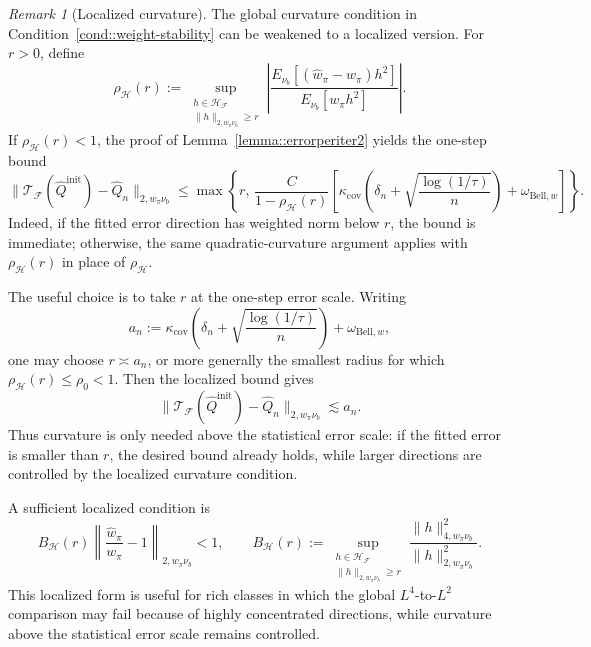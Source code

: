 \documentclass{article}
\theoremstyle{plain}
\theoremstyle{definition}
\theoremstyle{remark}
\newtheorem{remark}{Remark}
\begin{document}
\begin{remark}[Localized curvature]
\label{rem:localized-curvature}
The global curvature condition in Condition~\ref{cond::weight-stability} can be
weakened to a localized version. For \(r>0\), define
\[
\rho_{\mathcal H}(r)
:=
\sup_{\substack{h\in\mathcal H_{\mathcal F}\\
\|h\|_{2,w_\pi\nu_b}\ge r}}
\left|
\frac{E_{\nu_b}[(\widehat w_\pi-w_\pi)h^2]}
     {E_{\nu_b}[w_\pi h^2]}
\right|.
\]
If \(\rho_{\mathcal H}(r)<1\), the proof of
Lemma~\ref{lemma::errorperiter2} yields the one-step bound
\[
\|\mathcal T_{\mathcal F}(\hat Q^{\mathrm{init}})-\hat Q_n\|_{2,w_\pi\nu_b}
\le
\max\left\{
r,\,
\frac{C}{1-\rho_{\mathcal H}(r)}
\left[
\kappa_{\mathrm{cov}}\left(\delta_n+\sqrt{\frac{\log(1/\tau)}{n}}\right)
+\omega_{\mathrm{Bell},w}
\right]
\right\}.
\]
Indeed, if the fitted error direction has weighted norm below \(r\), the bound
is immediate; otherwise, the same quadratic-curvature argument applies with
\(\rho_{\mathcal H}(r)\) in place of \(\rho_{\mathcal H}\).

The useful choice is to take \(r\) at the one-step error scale. Writing
\[
a_n
:=
\kappa_{\mathrm{cov}}\left(\delta_n+\sqrt{\frac{\log(1/\tau)}{n}}\right)
+\omega_{\mathrm{Bell},w},
\]
one may choose \(r\asymp a_n\), or more generally the smallest radius for which
\(\rho_{\mathcal H}(r)\le\rho_0<1\). Then the localized bound gives
\[
\|\mathcal T_{\mathcal F}(\hat Q^{\mathrm{init}})-\hat Q_n\|_{2,w_\pi\nu_b}
\lesssim a_n .
\]
Thus curvature is only needed above the statistical error scale: if the fitted
error is smaller than \(r\), the desired bound already holds, while larger
directions are controlled by the localized curvature condition.

A sufficient localized condition is
\[
B_{\mathcal H}(r)
\left\|\frac{\widehat w_\pi}{w_\pi}-1\right\|_{2,w_\pi\nu_b}<1,
\qquad
B_{\mathcal H}(r)
:=
\sup_{\substack{h\in\mathcal H_{\mathcal F}\\
\|h\|_{2,w_\pi\nu_b}\ge r}}
\frac{\|h\|_{4,w_\pi\nu_b}^2}{\|h\|_{2,w_\pi\nu_b}^2}.
\]
This localized form is useful for rich classes in which the global
\(L^4\)-to-\(L^2\) comparison may fail because of highly concentrated
directions, while curvature above the statistical error scale remains
controlled.
\end{remark}
\end{document}
